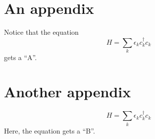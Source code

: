 \appendix
\chapter{An appendix}\label{ch:appendix1}
Notice that the equation
\begin{equation}\label{eq:equation1}
	H = \sum_{k}\epsilon_kc_k^\dagger c_k
\end{equation}
gets a ``A''.

\chapter{Another appendix}\label{ch:appendix2}
\begin{equation}
	H = \sum_{k}\epsilon_kc_k^\dagger c_k
\end{equation}
Here, the equation gets a ``B''.